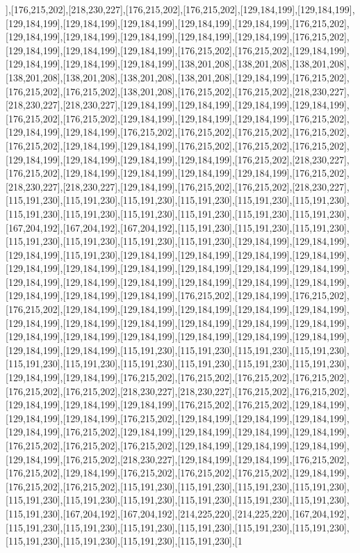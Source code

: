 ],[176,215,202],[218,230,227],[176,215,202],[176,215,202],[129,184,199],[129,184,199],[129,184,199],[129,184,199],[129,184,199],[129,184,199],[129,184,199],[176,215,202],[129,184,199],[129,184,199],[129,184,199],[129,184,199],[129,184,199],[176,215,202],[129,184,199],[129,184,199],[129,184,199],[176,215,202],[176,215,202],[129,184,199],[129,184,199],[129,184,199],[129,184,199],[138,201,208],[138,201,208],[138,201,208],[138,201,208],[138,201,208],[138,201,208],[138,201,208],[129,184,199],[176,215,202],[176,215,202],[176,215,202],[138,201,208],[176,215,202],[176,215,202],[218,230,227],[218,230,227],[218,230,227],[129,184,199],[129,184,199],[129,184,199],[129,184,199],[176,215,202],[176,215,202],[129,184,199],[129,184,199],[129,184,199],[176,215,202],[129,184,199],[129,184,199],[176,215,202],[176,215,202],[176,215,202],[176,215,202],[176,215,202],[129,184,199],[129,184,199],[176,215,202],[176,215,202],[176,215,202],[129,184,199],[129,184,199],[129,184,199],[129,184,199],[176,215,202],[218,230,227],[176,215,202],[129,184,199],[129,184,199],[129,184,199],[129,184,199],[176,215,202],[218,230,227],[218,230,227],[129,184,199],[176,215,202],[176,215,202],[218,230,227],[115,191,230],[115,191,230],[115,191,230],[115,191,230],[115,191,230],[115,191,230],[115,191,230],[115,191,230],[115,191,230],[115,191,230],[115,191,230],[115,191,230],[167,204,192],[167,204,192],[167,204,192],[115,191,230],[115,191,230],[115,191,230],[115,191,230],[115,191,230],[115,191,230],[115,191,230],[129,184,199],[129,184,199],[129,184,199],[115,191,230],[129,184,199],[129,184,199],[129,184,199],[129,184,199],[129,184,199],[129,184,199],[129,184,199],[129,184,199],[129,184,199],[129,184,199],[129,184,199],[129,184,199],[129,184,199],[129,184,199],[129,184,199],[129,184,199],[129,184,199],[129,184,199],[129,184,199],[176,215,202],[129,184,199],[176,215,202],[176,215,202],[129,184,199],[129,184,199],[129,184,199],[129,184,199],[129,184,199],[129,184,199],[129,184,199],[129,184,199],[129,184,199],[129,184,199],[129,184,199],[129,184,199],[129,184,199],[129,184,199],[129,184,199],[129,184,199],[129,184,199],[129,184,199],[129,184,199],[115,191,230],[115,191,230],[115,191,230],[115,191,230],[115,191,230],[115,191,230],[115,191,230],[115,191,230],[115,191,230],[115,191,230],[129,184,199],[129,184,199],[176,215,202],[176,215,202],[176,215,202],[176,215,202],[176,215,202],[176,215,202],[218,230,227],[218,230,227],[176,215,202],[176,215,202],[129,184,199],[129,184,199],[129,184,199],[176,215,202],[176,215,202],[129,184,199],[129,184,199],[129,184,199],[176,215,202],[129,184,199],[129,184,199],[129,184,199],[129,184,199],[176,215,202],[129,184,199],[129,184,199],[129,184,199],[129,184,199],[176,215,202],[176,215,202],[176,215,202],[129,184,199],[129,184,199],[129,184,199],[129,184,199],[176,215,202],[218,230,227],[129,184,199],[129,184,199],[176,215,202],[176,215,202],[129,184,199],[176,215,202],[176,215,202],[176,215,202],[129,184,199],[176,215,202],[176,215,202],[115,191,230],[115,191,230],[115,191,230],[115,191,230],[115,191,230],[115,191,230],[115,191,230],[115,191,230],[115,191,230],[115,191,230],[115,191,230],[167,204,192],[167,204,192],[214,225,220],[214,225,220],[167,204,192],[115,191,230],[115,191,230],[115,191,230],[115,191,230],[115,191,230],[115,191,230],[115,191,230],[115,191,230],[115,191,230],[115,191,230],[1